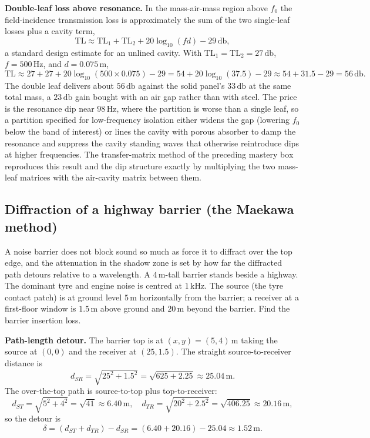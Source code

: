 \textbf{Double-leaf loss above resonance.} In the mass-air-mass region
above $f_0$ the field-incidence transmission loss is approximately the sum
of the two single-leaf losses plus a cavity term,
\[
\text{TL} \approx \text{TL}_1 + \text{TL}_2
              + 20\log_{10}(f d) - 29\,\si{\decibel},
\]
a standard design estimate for an unlined cavity. With
$\text{TL}_1=\text{TL}_2=27\,\si{\decibel}$, $f=500\,\si{\hertz}$, and
$d=0.075\,\si{\meter}$,
\[
\text{TL} \approx 27 + 27 + 20\log_{10}(500\times 0.075) - 29
        = 54 + 20\log_{10}(37.5) - 29
        \approx 54 + 31.5 - 29 = 56\,\si{\decibel}.
\]
The double leaf delivers about $56\,\si{\decibel}$ against the solid
panel's $33\,\si{\decibel}$ at the same total mass, a $23\,\si{\decibel}$
gain bought with an air gap rather than with steel. The price is the
resonance dip near $98\,\si{\hertz}$, where the partition is worse than a
single leaf, so a partition specified for low-frequency isolation either
widens the gap (lowering $f_0$ below the band of interest) or lines the
cavity with porous absorber to damp the resonance and suppress the cavity
standing waves that otherwise reintroduce dips at higher frequencies. The
transfer-matrix method of the preceding mastery box reproduces this
result and the dip structure exactly by multiplying the two mass-leaf
matrices with the air-cavity matrix between them.

\subsection{Diffraction of a highway barrier (the Maekawa method)}

A noise barrier does not block sound so much as force it to diffract over
the top edge, and the attenuation in the shadow zone is set by how far the
diffracted path detours relative to a wavelength. A
$4\,\si{\meter}$-tall barrier stands beside a highway. The dominant tyre
and engine noise is centred at $1\,\si{\kilo\hertz}$. The source (the tyre
contact patch) is at ground level $5\,\si{\meter}$ horizontally from the
barrier; a receiver at a first-floor window is $1.5\,\si{\meter}$ above
ground and $20\,\si{\meter}$ beyond the barrier. Find the barrier
insertion loss.

\textbf{Path-length detour.} The barrier top is at
$(x,y)=(5,4)\,\si{\meter}$ taking the source at $(0,0)$ and the receiver
at $(25,1.5)$. The straight source-to-receiver distance is
\[
d_{SR} = \sqrt{25^2 + 1.5^2} = \sqrt{625 + 2.25} \approx 25.04\,\si{\meter}.
\]
The over-the-top path is source-to-top plus top-to-receiver:
\[
d_{ST} = \sqrt{5^2 + 4^2} = \sqrt{41} \approx 6.40\,\si{\meter}, \quad
d_{TR} = \sqrt{20^2 + 2.5^2} = \sqrt{406.25} \approx 20.16\,\si{\meter},
\]
so the detour is
\[
\delta = (d_{ST}+d_{TR}) - d_{SR}
       = (6.40 + 20.16) - 25.04 \approx 1.52\,\si{\meter}.
\]


